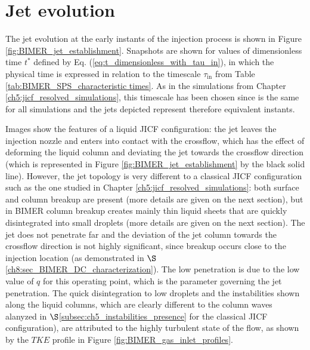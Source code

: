 \section{Jet evolution}

The jet evolution at the early instants of the injection process is shown in Figure \ref{fig:BIMER_jet_establishment}. Snapshots are shown for values of dimensionless time $t^*$ defined by Eq. (\ref{eq:t_dimensionless_with_tau_in}), in which the physical time is expressed in relation to the timescale $\tau_\mathrm{in}$ from Table \ref{tab:BIMER_SPS_characteristic times}. As in the simulations from Chapter \ref{ch5:jicf_resolved_simulations}, this timescale has been chosen since is the same for all simulations and the jets depicted represent therefore equivalent instants.

Images show the features of a liquid JICF configuration: the jet leaves the injection nozzle and enters into contact with the crossflow, which has the effect of deforming the liquid column and deviating the jet towards the crossflow direction (which is represented in Figure \ref{fig:BIMER_jet_establishment} by the black solid line). However, the jet topology is very different to a classical JICF configuration such as the one studied in Chapter \ref{ch5:jicf_resolved_simulations}: both surface and column breakup are present (more details are given on the next section), but in BIMER column breakup creates mainly thin liquid sheets that are quickly disintegrated into small droplets (more details are given on the next section). The jet does not penetrate far and the deviation of the jet column towards the crossflow direction is not highly significant, since breakup occurs close to the injection location (as demonstrated in $\S$\ref{ch8:sec_BIMER_DC_characterization}). The low penetration is due to the low value of $q$ for this operating point, which is the parameter governing the jet penetration. The quick disintegration to low droplets and the instabilities shown along the liquid columns, which are clearly different to the column waves alanyzed in $\S$\ref{subsec:ch5_instabilities_presence} for the classical JICF configuration), are attributed to the highly turbulent state of the flow, as shown by the $TKE$ profile in Figure \ref{fig:BIMER_gas_inlet_profiles}.





